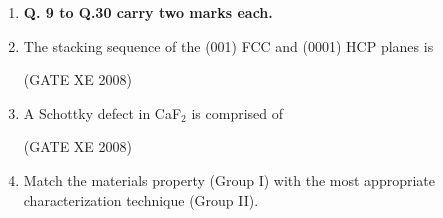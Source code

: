 \documentclass[12pt]{article}
\begin{document}
\begin{enumerate}
\begin{enumerate}
\item  X- and $\gamma$-ray radiation  
\item  visible light of all frequencies  
\item  ultra-violet (UV) light  
\item  all the frequencies greater than that of UV light 
\end{enumerate}    

    (GATE XE 2008)  

\item[] \textbf{Q. 9 to Q.30 carry two marks each.}
\item The stacking sequence of the (001) FCC and (0001) HCP planes is  

\begin{enumerate}
\end{enumerate}

(GATE XE 2008)

\item A Schottky defect in CaF$_2$ is comprised of  

\begin{enumerate}
\end{enumerate}

(GATE XE 2008)

\item Match the materials property (Group I) with the most appropriate characterization technique (Group II).  


\end{enumerate}
\end{document}
